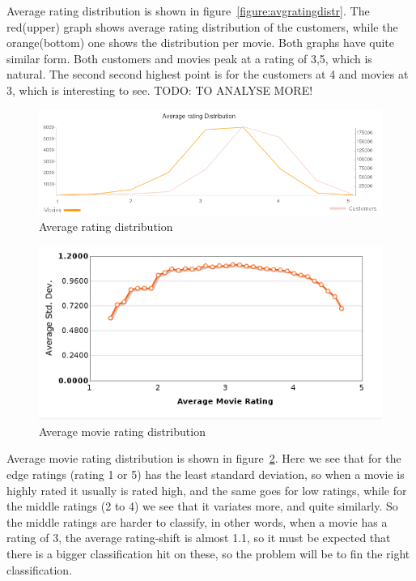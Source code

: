 Average rating distribution is shown in figure~\ref{figure:avgratingdistr}. The red(upper) graph shows average rating distribution of the customers, while the orange(bottom) one shows the distribution per movie. Both graphs have quite similar form. Both customers and movies peak at a rating of 3,5, which is natural. The second second highest point is for the customers at 4 and movies at 3, which is interesting to see. TODO: TO ANALYSE MORE!

\begin{figure}[H]
\includegraphics[width=5in]{image/avgratdistrover.png}
\centering
\caption{Average rating distribution}
\label{figure:avgratdistrover}
\end{figure}


\begin{figure}[H]
\includegraphics[width=5in]{image/avgmovierating.png}
\centering
\caption{Average movie rating distribution}
\label{figure:avgmovierating}
\end{figure}

Average movie rating distribution is shown in figure~\ref{figure:avgmovierating}. Here we see that for the edge ratings (rating 1 or 5) has the least standard deviation, so when a movie is highly rated it usually is rated high, and the same goes for low ratings, while for the middle ratings (2 to 4) we see that it variates more, and quite similarly. So the middle ratings are harder to classify, in other words, when a movie has a rating of 3, the average rating-shift is almost 1.1, so it must be expected that there is a bigger classification hit on these, so the problem will be to fin the right classification.





